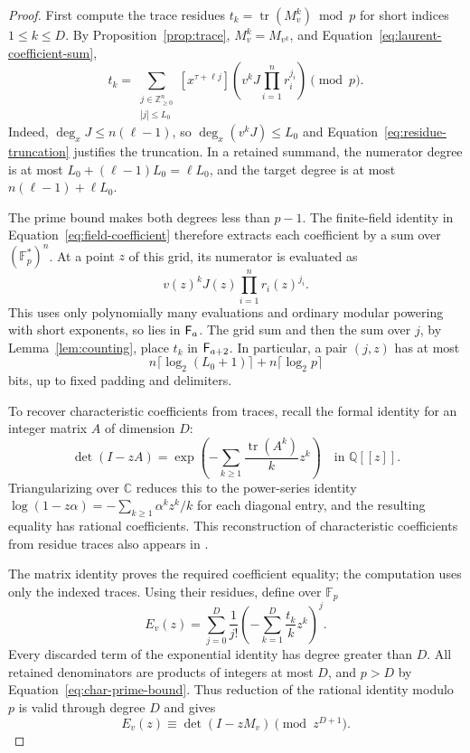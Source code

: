 \begin{proof}
First compute the trace residues $t_k=\operatorname{tr}(M_v^k)\bmod p$
for short indices $1\le k\le D$.  By Proposition~\ref{prop:trace},
$M_v^k=M_{v^k}$, and Equation~\eqref{eq:laurent-coefficient-sum},
\begin{equation}\label{eq:trace-extraction}
 t_k=\sum_{\substack{j\in\mathbb Z_{\ge0}^n\\|j|\le L_0}}
 [x^{\tau+\ell j}]
 \left(v^kJ\prod_{i=1}^n r_i^{j_i}\right)\pmod p.
\end{equation}
Indeed, $\deg_x J\le n(\ell-1)$, so
$\deg_x(v^kJ)\le L_0$ and Equation~\eqref{eq:residue-truncation}
justifies the truncation.  In a retained summand, the numerator
degree is at most $L_0+(\ell-1)L_0=\ell L_0$, and the target
degree is at most $n(\ell-1)+\ell L_0$.

The prime bound makes both degrees less than $p-1$.
The finite-field identity in Equation~\eqref{eq:field-coefficient}
therefore extracts each coefficient
by a sum over $(\mathbb F_p^*)^n$.  At a point $z$ of this grid,
its numerator is evaluated as
\[
 v(z)^kJ(z)\prod_{i=1}^n r_i(z)^{j_i}.
\]
This uses only polynomially many evaluations and ordinary modular
powering with short exponents, so lies in $\mathsf F_{a}$.
The grid sum and then the sum over $j$, by
Lemma~\ref{lem:counting}, place $t_k$ in $\mathsf F_{a+2}$.
In particular, a pair $(j,z)$ has at most
\[
 n\lceil\log_2(L_0+1)\rceil+n\lceil\log_2p\rceil
\]
bits, up to fixed padding and delimiters.

To recover characteristic coefficients from traces, recall the formal
identity for an integer matrix $A$ of dimension $D$:
\begin{equation}\label{eq:log-determinant}
 \det(I-zA)=
 \exp\left(-\sum_{k\ge1}\frac{\operatorname{tr}(A^k)}{k}z^k\right)
 \quad\text{in }\mathbb Q[[z]].
\end{equation}
Triangularizing over $\mathbb C$ reduces this to the power-series
identity $\log(1-z\alpha)=-\sum_{k\ge1}\alpha^kz^k/k$ for each
diagonal entry, and the resulting equality has rational coefficients.
This reconstruction of characteristic coefficients from residue
traces also appears in
\cite[Author version, Section~5, Equations~(5.7)--(5.9)]{CattaniDickensteinSturmfels1996}.

The matrix identity proves the required coefficient equality; the
computation uses only the indexed traces.  Using their residues,
define over $\mathbb F_p$
\begin{equation}\label{eq:truncated-exponential}
 E_v(z)=\sum_{j=0}^D\frac1{j!}
 \left(-\sum_{k=1}^D\frac{t_k}{k}z^k\right)^j.
\end{equation}
Every discarded term of the exponential identity has degree greater
than $D$.  All retained denominators are products of integers at most
$D$, and $p>D$ by Equation~\eqref{eq:char-prime-bound}.  Thus reduction
of the rational identity modulo $p$ is valid through degree $D$ and
gives
\begin{equation}\label{eq:exponential-congruence}
 E_v(z)\equiv\det(I-zM_v)\pmod{z^{D+1}}.
\end{equation}


\end{proof}
